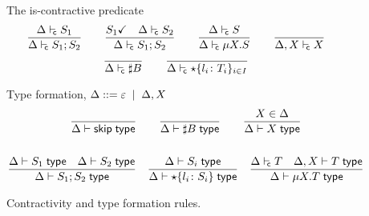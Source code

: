 \begin{figure}
  The is-contractive predicate \hfill{}
  \begin{gather*}
    \frac{
      \isContr{S_1}
    }{
      \isContr{S_1;S_2}
    }
    \qquad
    \frac{
      \DONE{S_1}
      \quad
      \isContr{S_2}
    }{
      \isContr{S_1;S_2}
    }
    \qquad
    \frac{
      \isContr S
    }{
      \isContr{\mu X.S}
    }
    \qquad
    \frac{}{
      \isContr[\Delta,X] X
    }
    \\
    \frac{}
    {
      \isContr {\sharp B}
    }
    \qquad
    \frac{}
    {
      \isContr {\star \{ l_i \colon T_i\}_{i\in I}}
    }
  \end{gather*}
  
  Type formation, $\Delta ::= \varepsilon \grmor \Delta, X$ \hfill{}
  \begin{gather*}
    \frac{}
    {
      \isType \skipk
    }
    \qquad
    \frac{}
    {
      \isType {\sharp B}
    }
    \qquad
    \frac{
      X \in \Delta
    }{
      \isType{X}
    }
    \\\\
    \frac{
      \isType{S_1}
      \quad
      \isType{S_2}
    }{
      \isType{S_1;S_2}
    }
    \quad
    \frac{
      \isType{S_i}
    }{
      \isType{\star 
      \{ l_i \colon S_i\}}
    }
    \quad
    \frac{
      \isContr T
      \quad 
      \isType [\Delta, X] T
    }{
      \isType {\mu X. T}
    }
  \end{gather*}
  \caption{Contractivity and type formation rules.}
  \label{fig:contractivity_type_form_rules}
\end{figure}
